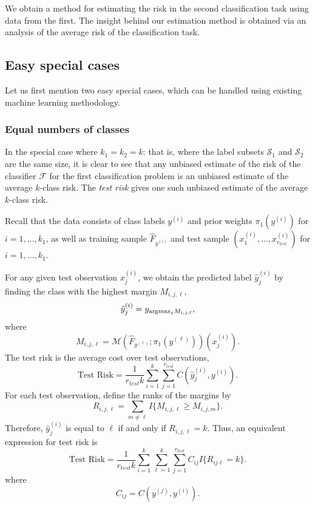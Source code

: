 \documentclass[12pt]{article}
\begin{document}
We obtain a method for estimating the risk in the second
classification task using data from the first.  The insight behind our
estimation method is obtained via an analysis of the average risk of
the classification task.

\subsection{Easy special cases}

Let us first mention two easy special cases, which can be handled
using existing machine learning methodology.

\subsubsection{Equal numbers of classes}

In the special case where $k_1 = k_2 = k$: that is, where the label
subsets $\mathcal{S}_1$ and $\mathcal{S}_2$ are the same size, it is
clear to see that any unbiased estimate of the risk of the classifier
$\mathcal{F}$ for the first classification problem is an unbiased
estimate of the average $k$-class risk.  The \emph{test risk}
gives one such unbiased estimate of the average $k$-class risk.

Recall that the data consists of class labels $y^{(i)}$ and prior
weights $\pi_1(y^{(i)})$ for $i = 1,\hdots, k_1$, as well as training
sample $\hat{F}_{y^{(i)}}$ and test sample $(x_1^{(i)},\hdots,
x_{r_{test}}^{(i)})$ for $i = 1,\hdots, k_1$.

For any given test observation $x_j^{(i)}$, we obtain the predicted
label $\hat{y}_j^{(i)}$ by finding the class with the highest margin $M_{i, j, \ell}$,
\[
\hat{y}_j^{(i)} = y_{\text{argmax}_\ell M_{i, j, \ell}},
\]
where
\[ 
M_{i, j, \ell} = \mathcal{M}(\hat{F}_{y^{(\ell)}}; \pi_1(y^{(\ell)}))(x_j^{(i)}).
\]
The test risk is the average cost over test observations,
\begin{equation}
\text{Test Risk} = \frac{1}{r_{test}k} \sum_{i=1}^k \sum_{j=1}^{r_{test}} C(\hat{y}_j^{(i)}, y^{(i)}).
\end{equation}
For each test observation, define the ranks of the margins by
\[
R_{i,j,\ell} = \sum_{m \neq \ell} I\{M_{i,j,\ell} \geq M_{i, j, m}\}.
\]
Therefore, $\hat{y}_j^{(i)}$ is equal to $\ell$ if and only if $R_{i,j,\ell} = k$.
Thus, an equivalent expression for test risk is
\begin{equation}\label{eq:test_risk}
\text{Test Risk} = \frac{1}{r_{test}k} \sum_{i=1}^k \sum_{\ell=1}^k \sum_{j=1}^{r_{test}} C_{ij} I\{R_{ij\ell} = k\}.
\end{equation}
where
\[
C_{ij} = C(y^{(j)}, y^{(i)}).
\]
\end{document}
